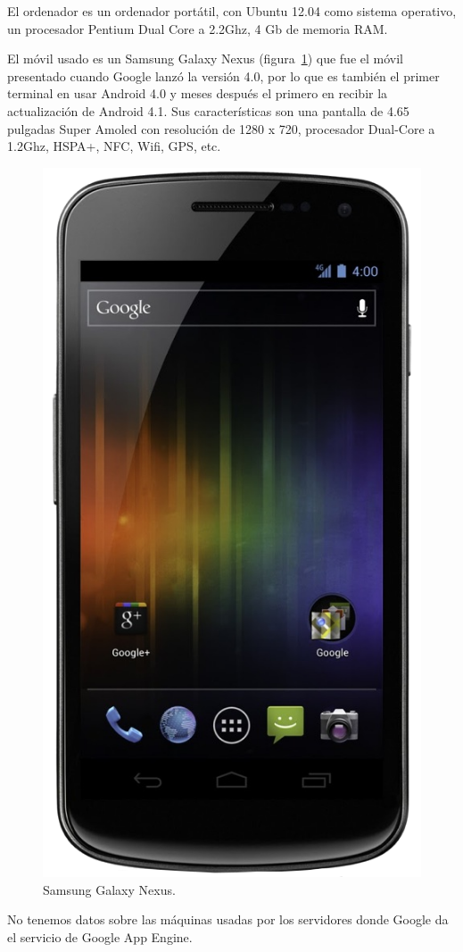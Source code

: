 El ordenador es un ordenador portátil, con Ubuntu 12.04 como sistema operativo, un procesador Pentium Dual Core a 2.2Ghz, 4 Gb de memoria RAM.

El móvil usado es un Samsung Galaxy Nexus (figura~\ref{fig:nexus}) que fue el móvil presentado cuando Google lanzó la versión 4.0, por lo que es también el primer terminal en usar Android 4.0 y meses después el primero en recibir la actualización de Android 4.1. Sus características son una pantalla de 4.65 pulgadas Super Amoled con resolución de 1280 x 720, procesador Dual-Core a 1.2Ghz, HSPA+, NFC, Wifi, GPS, etc.

\begin{figure}
  \centering
    \includegraphics[scale=0.3]{./Introduccion/imagenes/nexus.png}
  \caption{Samsung Galaxy Nexus.}
  \label{fig:nexus}
\end{figure}

No tenemos datos sobre las máquinas usadas por los servidores donde Google da el servicio de Google App Engine.

